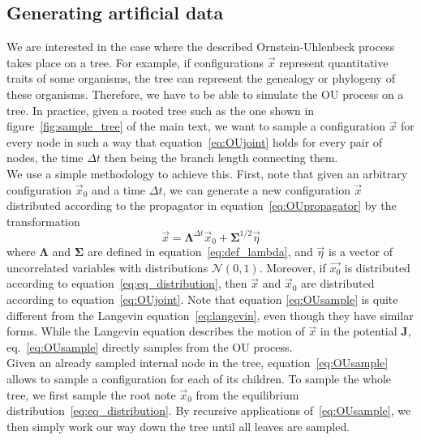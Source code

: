 \documentclass[preprint,amsmath,amssymb,superscriptaddress,showpacs,pre]{revtex4-1}
\def\vx{\vec x}
\newcommand{\Lam}{\bm{\Lambda}}
\newcommand{\Sig}{\bm{\Sigma}}
\begin{document}
\subsection{Generating artificial data} %
\label{sub:generating_artificial_data}

	We are interested in the case where the described Ornstein-Uhlenbeck process takes place on a tree. 
	For example, if configurations $\vec{x}$ represent quantitative traits of some organisms, the tree can represent the genealogy or phylogeny of these organisms. 
	Therefore, we have to be able to simulate the OU process on a tree. 
	In practice, given a rooted tree such as the one shown in figure~\ref{fig:sample_tree} of the main text, we want to sample a configuration $\vec{x}$ for every node in such a way that equation~\eqref{eq:OUjoint} holds for every pair of nodes, the time $\Delta t$ then being the branch length connecting them. \\
	We use a simple methodology to achieve this. 
	First, note that given an arbitrary configuration $\vec{x}_0$ and a time $\Delta t$, we can generate a new configuration $\vec{x}$ distributed according to the propagator in equation~\eqref{eq:OUpropagator} by the transformation
	\begin{equation}
		\vx = \Lam^{\Delta t}\vx_0 + \Sig^{1/2}\vec{\eta}
		\label{eq:OUsample}
	\end{equation}
	where $\Lam$ and $\Sig$ are defined in equation~\eqref{eq:def_lambda}, and $\vec{\eta}$ is a vector of uncorrelated variables with distributions $\mathcal{N}(0,1)$. 
	Moreover, if $\vec{x_0}$ is distributed according to equation~\eqref{eq:eq_distribution}, then $\vx$ and $\vx_0$ are distributed according to equation~\eqref{eq:OUjoint}. 
	Note that equation \eqref{eq:OUsample} is quite different from the Langevin equation~\eqref{eq:langevin}, even though they have similar forms. 
	While the Langevin equation describes the motion of $\vx$ in the potential $\bm{J}$, eq.~\eqref{eq:OUsample} directly samples from the OU process. \\
	Given an already sampled internal node in the tree, equation~\eqref{eq:OUsample} allows to sample a configuration for each of its children. 
	To sample the whole tree, we first sample the root note $\vx_0$ from the equilibrium distribution~\eqref{eq:eq_distribution}. 
	By recursive applications of~\eqref{eq:OUsample}, we then simply work our way down the tree until all leaves are sampled.  


\end{document}
